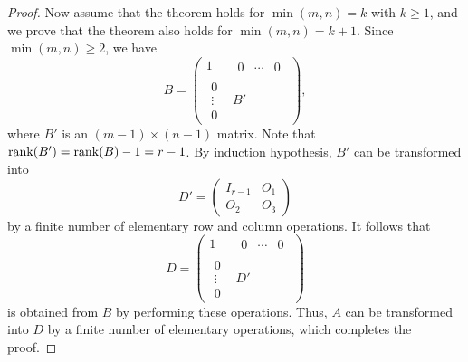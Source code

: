 \begin{proof}
  Now assume that the theorem holds for $\min(m, n) = k$ with $k \geq 1$, and
  we prove that the theorem also holds for $\min(m, n) = k + 1$.
  Since $\min(m, n) \geq 2$, we have
  \begin{equation*}
    B = \left(
      \begin{array}{c|c}
        1 & \begin{array}{ccc} 0 & \cdots & 0 \end{array} \\
        \hline
        \begin{array}{c} 0 \\ \vdots \\ 0 \end{array} & B'
      \end{array}
    \right),
  \end{equation*}
  where $B'$ is an $(m-1) \times (n-1)$ matrix.
  Note that $\operatorname{rank}(B') = \operatorname{rank}(B) - 1 = r - 1$.
  By induction hypothesis, $B'$ can be transformed into
  \begin{equation*}
    D' =
    \begin{pmatrix}
      I_{r-1} & O_1 \\
      O_2 & O_3
    \end{pmatrix}
  \end{equation*}
  by a finite number of elementary row and column operations.
  It follows that
  \begin{equation*}
    D = \left(
      \begin{array}{c|c}
        1 & \begin{array}{ccc} 0 & \cdots & 0 \end{array} \\
        \hline
        \begin{array}{c} 0 \\ \vdots \\ 0 \end{array} & D'
      \end{array}
    \right)
  \end{equation*}
  is obtained from $B$ by performing these operations.
  Thus, $A$ can be transformed into $D$ by a finite number of
  elementary operations, which completes the proof.
\end{proof}


